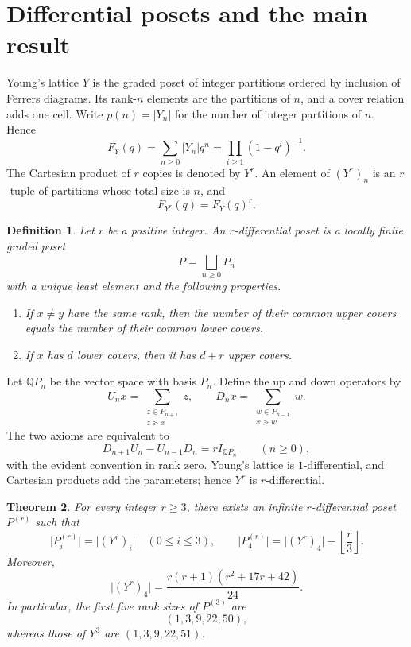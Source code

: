\documentclass[10pt,a4paper]{amsart}
\newtheorem{theorem}{Theorem}[section]
\newtheorem{definition}[theorem]{Definition}
\newcommand{\card}[1]{\lvert #1\rvert}
\begin{document}
\section{Differential posets and the main result}\label{sec:preliminaries}

Young's lattice $Y$ is the graded poset of integer partitions ordered by inclusion of Ferrers diagrams. Its rank-$n$ elements are the partitions of $n$, and a cover relation adds one cell. Write $p(n)=\card{Y_n}$ for the number of integer partitions of $n$. Hence
\[
  F_Y(q)=\sum_{n\geq0}\card{Y_n}q^n
  =\prod_{i\geq1}(1-q^i)^{-1}.
\]
The Cartesian product of $r$ copies is denoted by $Y^r$. An element of $(Y^r)_n$ is an $r$-tuple of partitions whose total size is $n$, and
\[
  F_{Y^r}(q)=F_Y(q)^r.
\]

\begin{definition}\label{def:differential-poset}
Let $r$ be a positive integer. An \emph{$r$-differential poset} is a locally finite graded poset
\[
  P=\bigsqcup_{n\geq0}P_n
\]
with a unique least element and the following properties.
\begin{enumerate}
  \item[\textup{(D1)}] If $x\neq y$ have the same rank, then the number of their common upper covers equals the number of their common lower covers.
  \item[\textup{(D2)}] If $x$ has $d$ lower covers, then it has $d+r$ upper covers.
\end{enumerate}
\end{definition}

Let $\mathbb{Q}P_n$ be the vector space with basis $P_n$. Define the up and down operators by
\[
  U_nx=\sum_{\substack{z\in P_{n+1}\\z\gtrdot x}}z,
  \qquad
  D_nx=\sum_{\substack{w\in P_{n-1}\\x\gtrdot w}}w.
\]
The two axioms are equivalent to
\begin{equation}\label{eq:differential-identity}
  D_{n+1}U_n-U_{n-1}D_n=rI_{\mathbb{Q}P_n}
  \qquad(n\geq0),
\end{equation}
with the evident convention in rank zero. Young's lattice is $1$-differential, and Cartesian products add the parameters; hence $Y^r$ is $r$-differential.

\begin{theorem}\label{thm:main}
For every integer $r\geq3$, there exists an infinite $r$-differential poset $P^{(r)}$ such that
\[
  \card{P^{(r)}_i}=\card{(Y^r)_i}\quad(0\leq i\leq3),
  \qquad
  \card{P^{(r)}_4}=\card{(Y^r)_4}-\left\lfloor\frac r3\right\rfloor.
\]
Moreover,
\begin{equation}\label{eq:Y-r-rank4}
  \card{(Y^r)_4}=\frac{r(r+1)(r^2+17r+42)}{24}.
\end{equation}
In particular, the first five rank sizes of $P^{(3)}$ are
\[
  (1,3,9,22,50),
\]
whereas those of $Y^3$ are $(1,3,9,22,51)$.
\end{theorem}
\end{document}
